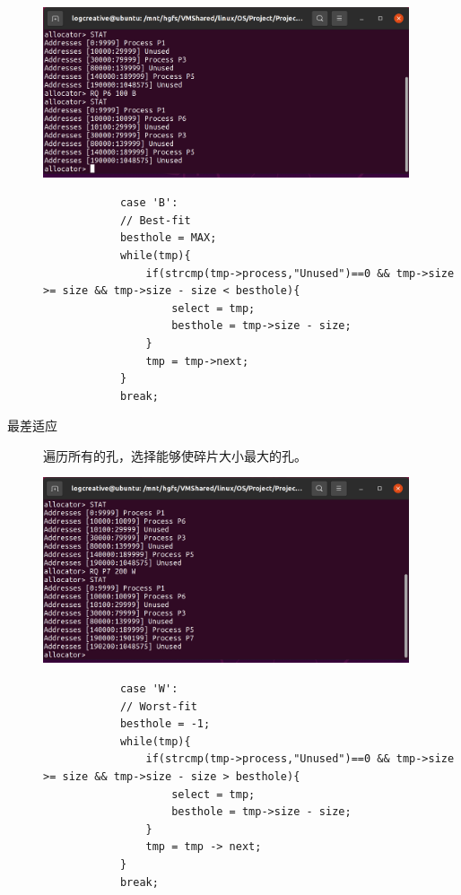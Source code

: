 \documentclass[12pt,a4paper]{article}
\newenvironment{problems}{\begin{list}{}{\renewcommand{\makelabel}[1]{\textbf{##1}\hfil}}}{\end{list}}
\begin{document}
\begin{problems}
\begin{description}
        \includegraphics[width=0.88\textwidth]{RQB.png}
         
        \begin{lstlisting}
            case 'B':
            // Best-fit
            besthole = MAX;
            while(tmp){
                if(strcmp(tmp->process,"Unused")==0 && tmp->size >= size && tmp->size - size < besthole){
                    select = tmp;
                    besthole = tmp->size - size;
                }
                tmp = tmp->next;
            }
            break;
        \end{lstlisting} 
        \item[最差适应] 遍历所有的孔，选择能够使碎片大小最大的孔。
        
        \includegraphics[width=0.88\textwidth]{RQW.png}
        
        \begin{lstlisting}
            case 'W':
            // Worst-fit
            besthole = -1;
            while(tmp){
                if(strcmp(tmp->process,"Unused")==0 && tmp->size >= size && tmp->size - size > besthole){
                    select = tmp;
                    besthole = tmp->size - size;
                }
                tmp = tmp -> next;
            }
            break;
        \end{lstlisting} 
    \end{description}
    

\end{problems}
\end{document}
